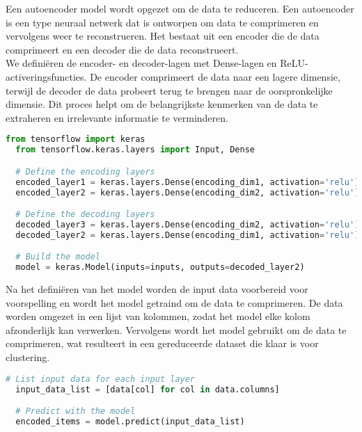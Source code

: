 Een autoencoder model wordt opgezet om de data te reduceren. Een autoencoder is een type neuraal netwerk dat is ontworpen om data te comprimeren en vervolgens weer te reconstrueren. Het bestaat uit een encoder die de data comprimeert en een decoder die de data reconstrueert.
\\We definiëren de encoder- en decoder-lagen met Dense-lagen en ReLU-activeringsfuncties. De encoder comprimeert de data naar een lagere dimensie, terwijl de decoder de data probeert terug te brengen naar de oorspronkelijke dimensie. Dit proces helpt om de belangrijkste kenmerken van de data te extraheren en irrelevante informatie te verminderen.
\begin{lstlisting}[language=Python, caption={Opzetten van het autoencoder model}]
  from tensorflow import keras
  from tensorflow.keras.layers import Input, Dense

  # Define the encoding layers
  encoded_layer1 = keras.layers.Dense(encoding_dim1, activation='relu')(preprocessed_inputs[0])
  encoded_layer2 = keras.layers.Dense(encoding_dim2, activation='relu')(encoded_layer1)

  # Define the decoding layers
  decoded_layer3 = keras.layers.Dense(encoding_dim2, activation='relu')(encoded_layer2)
  decoded_layer2 = keras.layers.Dense(encoding_dim1, activation='relu')(decoded_layer3)

  # Build the model
  model = keras.Model(inputs=inputs, outputs=decoded_layer2)
\end{lstlisting}


Na het definiëren van het model worden de input data voorbereid voor voorspelling en wordt het model getraind om de data te comprimeren. De data worden omgezet in een lijst van kolommen, zodat het model elke kolom afzonderlijk kan verwerken. Vervolgens wordt het model gebruikt om de data te comprimeren, wat resulteert in een gereduceerde dataset die klaar is voor clustering.
\begin{lstlisting}[language=Python, caption={Trainen van het model}]
  # List input data for each input layer
  input_data_list = [data[col] for col in data.columns]

  # Predict with the model
  encoded_items = model.predict(input_data_list)
\end{lstlisting}

\section{}%
\label{sec:clusteringPOC}

